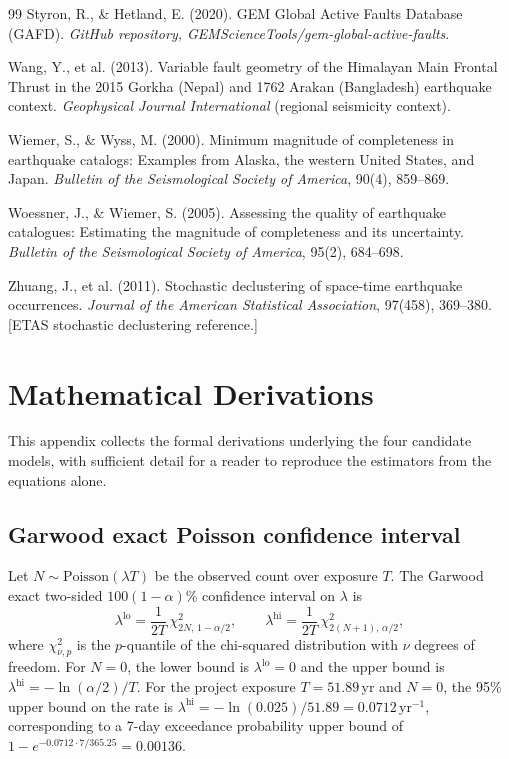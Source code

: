 \documentclass[10pt,a4paper,twocolumn]{article}
\begin{document}
\begin{thebibliography}{99}
 Styron, R., \& Hetland, E. (2020). GEM Global Active Faults Database (GAFD). \emph{GitHub repository, GEMScienceTools/gem-global-active-faults}.

 Wang, Y., et al. (2013). Variable fault geometry of the Himalayan Main Frontal Thrust in the 2015 Gorkha (Nepal) and 1762 Arakan (Bangladesh) earthquake context. \emph{Geophysical Journal International} (regional seismicity context).

 Wiemer, S., \& Wyss, M. (2000). Minimum magnitude of completeness in earthquake catalogs: Examples from Alaska, the western United States, and Japan. \emph{Bulletin of the Seismological Society of America}, 90(4), 859--869.

 Woessner, J., \& Wiemer, S. (2005). Assessing the quality of earthquake catalogues: Estimating the magnitude of completeness and its uncertainty. \emph{Bulletin of the Seismological Society of America}, 95(2), 684--698.

 Zhuang, J., et al. (2011). Stochastic declustering of space-time earthquake occurrences. \emph{Journal of the American Statistical Association}, 97(458), 369--380. [ETAS stochastic declustering reference.]

\end{thebibliography}

\appendix
\section{Mathematical Derivations}\label{app:derivations}

This appendix collects the formal derivations underlying the four candidate models, with sufficient detail for a reader to reproduce the estimators from the equations alone.

\subsection{Garwood exact Poisson confidence interval}\label{app:garwood}

Let $N\sim\text{Poisson}(\lambda T)$ be the observed count over exposure $T$. The Garwood \cite{garwood1936} exact two-sided $100(1-\alpha)\%$ confidence interval on $\lambda$ is
\[
\lambda^{\text{lo}} = \frac{1}{2T}\, \chi^2_{2N,\,1-\alpha/2}, \qquad \lambda^{\text{hi}} = \frac{1}{2T}\, \chi^2_{2(N+1),\,\alpha/2},
\]
where $\chi^2_{\nu,p}$ is the $p$-quantile of the chi-squared distribution with $\nu$ degrees of freedom. For $N=0$, the lower bound is $\lambda^{\text{lo}}=0$ and the upper bound is $\lambda^{\text{hi}} = -\ln(\alpha/2)/T$. For the project exposure $T=51.89$\,yr and $N=0$, the 95\% upper bound on the rate is $\lambda^{\text{hi}} = -\ln(0.025)/51.89 = 0.0712$\,yr$^{-1}$, corresponding to a 7-day exceedance probability upper bound of $1 - e^{-0.0712 \cdot 7/365.25} = 0.00136$.
\end{document}
